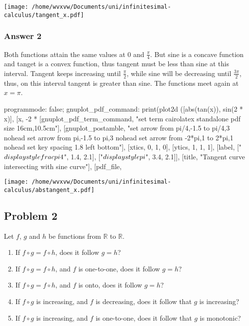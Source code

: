\documentclass[a4paper]{article}
\begin{document}
\texttt{[image: /home/wvxvw/Documents/uni/infinitesimal-calculus/tangent\_x.pdf]}
\subsubsection{Answer 2}
\label{sec-1-1-2}
Both functions attain the same values at 0 and $\frac{\pi}{4}$.  But sine is
a concave function and tanget is a convex function, thus tangent must be less
than sine at this interval.  Tangent keeps increasing until $\frac{\pi}{2}$,
while sine will be decreasing until $\frac{3\pi}{2}$, thus, on this interval
tangent is greater than sine.  The functions meet again at $x=\pi$.

\begin{maxima}
programmode: false;
gnuplot_pdf_command: %
print(plot2d ([abs(tan(x)), sin(2 * x)],
    [x, -2 * %
    [gnuplot_pdf_term_command, 
     "set term cairolatex standalone pdf size 16cm,10.5cm"],
    [gnuplot_postamble,
     "set arrow from pi/4,-1.5 to pi/4,3 nohead
      set arrow from pi,-1.5 to pi,3 nohead
      set arrow from -2*pi,1 to 2*pi,1 nohead
      set key spacing 1.8 left bottom"],
    [xtics, 0, 1, 0], [ytics, 1, 1, 1],
    [label, ["${\\displaystyle \\frac{\\pi}{4}}$", 1.4, 2.1],
            ["${\\displaystyle \\pi}$", 3.4, 2.1]],
    [title, "Tangent curve intersecting with sine curve"],
    [pdf_file, %
\end{maxima}

\texttt{[image: /home/wvxvw/Documents/uni/infinitesimal-calculus/abstangent\_x.pdf]}
\subsection{Problem 2}
\label{sec-1-2}
Let $f$, $g$ and $h$ be functions from $\mathbb{R}$ to $\mathbb{R}$.
\begin{enumerate}
\item If $f \circ g = f \circ h$, does it follow $g = h$?
\item If $f \circ g = f \circ h$, and $f$ is one-to-one, does it follow $g = h$?
\item If $f \circ g = f \circ h$, and $f$ is onto, does it follow $g = h$?
\item If $f \circ g$ is increasing, and $f$ is decreasing, does it follow that
      $g$ is increasing?
\item If $f \circ g$ is increasing, and $f$ is one-to-one, does it follow that
      $g$ is monotonic?
\end{enumerate}
\end{document}
